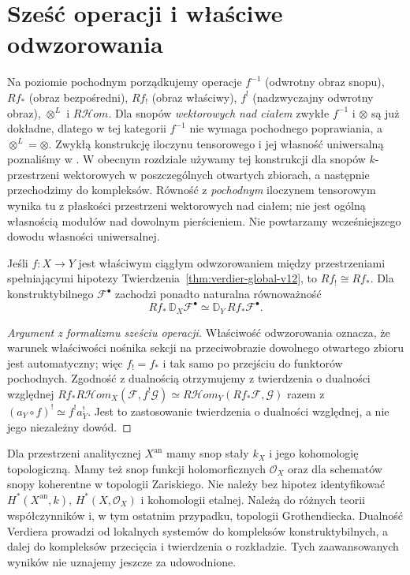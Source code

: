 \section{Sześć operacji i właściwe odwzorowania}
Na poziomie pochodnym porządkujemy operacje
$f^{-1}$ (odwrotny obraz snopu), $Rf_*$ (obraz bezpośredni),
$Rf_!$ (obraz właściwy), $f^!$ (nadzwyczajny odwrotny obraz),
$\otimes^L$ i $R\mathcal Hom$.
Dla snopów \emph{wektorowych nad ciałem} zwykłe $f^{-1}$
i $\otimes$ są już dokładne, dlatego w tej kategorii $f^{-1}$ nie wymaga
pochodnego poprawiania, a $\otimes^L=\otimes$.
Zwykłą konstrukcję iloczynu tensorowego i jej własność uniwersalną
poznaliśmy w
.
W obecnym rozdziale używamy tej konstrukcji dla
snopów $k$-przestrzeni wektorowych w poszczególnych
otwartych zbiorach, a następnie przechodzimy do kompleksów.
Równość z \emph{pochodnym} iloczynem tensorowym
wynika tu z płaskości przestrzeni wektorowych nad ciałem;
nie jest ogólną własnością modułów nad dowolnym pierścieniem.
Nie powtarzamy wcześniejszego dowodu własności uniwersalnej.

\begin{stwierdzenie}
\label{prop:verdier-proper-v12}
Jeśli $f:X\to Y$ jest właściwym ciągłym odwzorowaniem
między przestrzeniami spełniającymi hipotezy
Twierdzenia~\ref{thm:verdier-global-v12}, to
$Rf_!\cong Rf_*$. Dla konstruktybilnego
$\mathcal F^\bullet$ zachodzi ponadto naturalna
równoważność
\[
Rf_*\,\mathbb D_X\mathcal F^\bullet
\simeq\mathbb D_Y\,Rf_*\mathcal F^\bullet.
\]
\end{stwierdzenie}
\begin{proof}[Argument z formalizmu sześciu operacji]
Właściwość odwzorowania oznacza, że warunek właściwości
nośnika sekcji na przeciwobrazie dowolnego otwartego
zbioru jest automatyczny; więc $f_!=f_*$ i tak samo
po przejściu do funktorów pochodnych. Zgodność z dualnością
otrzymujemy z twierdzenia o dualności względnej
$Rf_*R\mathcal Hom_X(\mathcal F,f^!\mathcal G)
\simeq R\mathcal Hom_Y(Rf_*\mathcal F,\mathcal G)$
razem z $(a_Y\circ f)^!\simeq f^!a_Y^!$.
Jest to zastosowanie twierdzenia o dualności względnej,
a nie jego niezależny dowód.
\end{proof}

\begin{uwaga}
Dla przestrzeni analitycznej $X^{\mathrm{an}}$ mamy snop
stały $k_X$ i jego kohomologię topologiczną. Mamy też
snop funkcji holomorficznych $\mathcal O_X$ oraz dla
schematów snopy koherentne w topologii Zariskiego.
Nie należy bez hipotez identyfikować
$H^*(X^{\mathrm{an}},k)$, $H^*(X,\mathcal O_X)$
i kohomologii etalnej. Należą do różnych teorii
współczynników i, w tym ostatnim przypadku,
topologii Grothendiecka. Dualność Verdiera prowadzi
od lokalnych systemów do kompleksów konstruktybilnych,
a dalej do kompleksów przecięcia i twierdzenia o rozkładzie.
Tych zaawansowanych wyników nie uznajemy jeszcze za udowodnione.
\end{uwaga}

